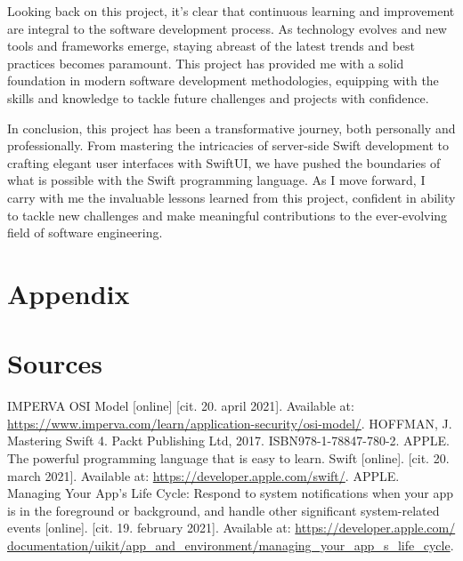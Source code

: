 \documentclass[
  language=english,
  figures=false,
  sourcecodes,
  index
]{kidiplom}
\begin{document}
\begin{kiconclusions}
Looking back on this project, it's clear that continuous learning and improvement are integral to the software development process. As technology evolves and new tools and frameworks emerge, staying abreast of the latest trends and best practices becomes paramount. This project has provided me with a solid foundation in modern software development methodologies, equipping with the skills and knowledge to tackle future challenges and projects with confidence.

In conclusion, this project has been a transformative journey, both personally and professionally. From mastering the intricacies of server-side Swift development to crafting elegant user interfaces with SwiftUI, we have pushed the boundaries of what is possible with the Swift programming language. As I move forward, I carry with me the invaluable lessons learned from this project, confident in ability to tackle new challenges and make meaningful contributions to the ever-evolving field of software engineering.

\end{kiconclusions}


\appendix

\section{Appendix}

\section{Sources} \label{sec:ObsahData}

\begin{thebibliography}{9}
 \uppercase{Imperva} OSI Model [online] [cit. 20. april 2021]. Available at: \url{https://www.imperva.com/learn/application-security/osi-model/}.
 \uppercase{Hoffman, J.} Mastering Swift 4. Packt Publishing Ltd, 2017. ISBN978-1-78847-780-2.
 \uppercase{Apple.} The powerful programming language that is easy to learn. Swift [online]. [cit. 20. march 2021]. Available at: \url{https://developer.apple.com/swift/}.
 \uppercase{Apple.} Managing Your App’s Life Cycle: Respond to system notifications when your app is in the foreground or background, and handle other significant system-related events [online]. [cit. 19. february 2021]. Available at: \url{https://developer.apple.com/ documentation/uikit/app_and_environment/managing_your_app_s_life_cycle}.
\end{thebibliography}

\printindex
\end{document}
